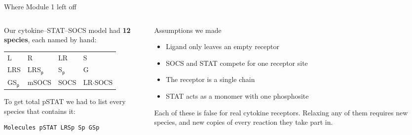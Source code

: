 \documentclass[aspectratio=169,10pt,t]{beamer}
\begin{document}
\begin{frame}[fragile]{Where Module 1 left off}
  \begin{columns}[T]
    \begin{column}{0.5\textwidth}
      Our cytokine--STAT--SOCS model had \textbf{12 species}, each named by hand:
      \vskip1mm
      \centering
      \small
      \begin{tabular}{llll}
        L & R & LR & S \\
        LRS & LRS$_\mathsf{p}$ & S$_\mathsf{p}$ & G \\
        GS$_\mathsf{p}$ & mSOCS & SOCS & LR$\cdot$SOCS
      \end{tabular}
      \vskip3mm
      \raggedright
      To get total pSTAT we had to list every species that contains it:
\begin{lstlisting}[language=bngl]
Molecules pSTAT LRSp Sp GSp
\end{lstlisting}
    \end{column}
    \begin{column}{0.46\textwidth}
      \begin{block}{Assumptions we made}
        \small
        \begin{itemize}
          \item<3-> Ligand only leaves an empty receptor
          \item<4-> SOCS and STAT compete for one receptor site
          \item<5-> The receptor is a single chain
          \item<6-> STAT acts as a monomer with one phosphosite
        \end{itemize}
      \end{block}
      \vskip1mm
      {\small Each of these is false for real cytokine receptors. Relaxing any of them
      requires new species, and new copies of every reaction they take part in.}
    \end{column}
  \end{columns}
\end{frame}
\end{document}
